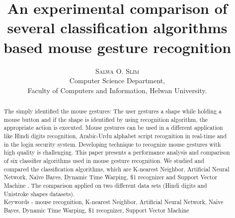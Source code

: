 \documentclass[twoside]{article}
\title{\vspace{-15mm}%
	\fontsize{24pt}{10pt}\selectfont
	\textbf{An experimental comparison of several classification algorithms based mouse gesture recognition }
	}
\author{%
	\large
	\textsc{Salwa O. Slim} \\[2mm]
	\normalsize	Computer Science Department,
	\\Faculty of Computers and Information, Helwan University.
	\vspace{-5mm}
	}
\date{}
\begin{document}
\maketitle
\thispagestyle{fancy}

\begin{abstract}
\noindent The simply identified the mouse gestures: The user gestures a shape while holding a mouse button and if the shape is identified by using recognition algorithm, the appropriate action is executed. Mouse gestures can be used in a different application like Hindi digits recognition, Arabic-Urdu alphabet script recognition in real-time and in the login security system. Developing technique to recognize mouse gestures with high quality is challenging. This paper presents a performance analysis and comparison of six classifier algorithms used in mouse gesture recognition. We studied and compared the classification algorithms, which are K-nearest Neighbor, Artificial Neural Network, Na\"{i}ve Bayes, Dynamic Time Warping, \$1 recognizer and Support Vector Machine . The comparison applied on two different data sets (Hindi digits and Unistroke shapes datasets).\\[2mm]
\noindent Keywords - mouse recognition, K-nearest Neighbor, Artificial Neural Network, Na\"{i}ve Bayes, Dynamic Time Warping, \$1 recognizer, Support Vector Machine 
\end{abstract}
	
\end{document}
